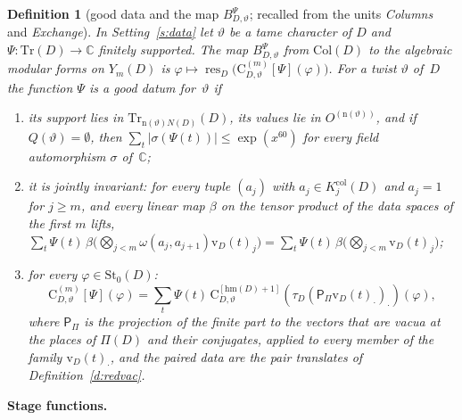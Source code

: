 \documentclass[11pt,a4paper]{article}
\newcommand{\m}[1]{\mbox{$#1$}}        %
\newcommand{\subhead}[1]{\par\addvspace{9pt plus 2pt}\Needspace{4\baselineskip}\noindent\textbf{#1}\enspace\ignorespaces}
\theoremstyle{plainx}
\theoremstyle{uprightx}
\newtheorem{definition}[theorem]{Definition}
\newcommand{\CC}{\mathbb{C}}
\newcommand{\ND}[1]{N(#1)}                         %
\newcommand{\rhoD}[1]{\mathrm{hm}(#1)}                 %
\newcommand{\Ys}[2]{Y_{#2}(#1)}                    %
\newcommand{\PiD}[1]{\Pi(#1)}                      %
\newcommand{\lvn}[1]{\mathrm{n}(#1)}               %
\newcommand{\Qs}[1]{Q(#1)}                         %
\newcommand{\Col}[1]{\mathrm{Col}(#1)}             %
\newcommand{\Stg}[2]{\mathrm{St}_{#2}(#1)}         %
\newcommand{\Bmu}[3]{B^{#3}_{#1,#2}}               %
\newcommand{\Tr}[1]{\mathrm{Tr}(#1)}               %
\newcommand{\Tadm}[2]{\mathrm{Tr}_{#2}(#1)}        %
\newcommand{\tdat}[3]{\mathrm{v}_{#1}(#2)_{#3}}    %
\newcommand{\Kst}[2]{K^{\mathrm{col}}_{#2}(#1)}                   %
\newcommand{\chnn}[4]{\mathrm{C}^{[#4]}_{#1,#2}(#3)}       %
\newcommand{\chcomb}[4]{\mathrm{C}^{(#4)}_{#1,#2}[#3]}     %
\newcommand{\resY}[1]{\operatorname{res}_{#1}}     %
\newcommand{\ptr}[3]{\tau_{#1}(#2)_{#3}}           %
\newcommand{\Oaw}[1]{O^{(#1)}}                     %
\begin{document}
\begin{definition}[good data and the map $\Bmu{D}{\vartheta}{\Psi}$; recalled from the units \emph{Columns} and
\emph{Exchange}]\label{d:good}
In Setting~\ref{s:data} let $\vartheta$ be a tame character of $D$ and $\Psi\colon\Tr{D}\to\CC$ finitely supported.
The map $\Bmu{D}{\vartheta}{\Psi}$ from $\Col{D}$ to the algebraic modular forms on $\Ys{D}{m}$ is
$\varphi\mapsto\resY{D}\bigl(\chcomb{D}{\vartheta}{\Psi}{m}(\varphi)\bigr)$. For a twist $\vartheta$ of~$D$ the
function $\Psi$ is a \emph{good datum for~$\vartheta$} if
\begin{enumerate}[label=(\roman*)]
\item its support lies in \m{\Tadm{D}{\lvn{\vartheta}\ND{D}}}, its values lie in \m{\Oaw{\lvn{\vartheta}}}, and if
  \m{\Qs{\vartheta}=\emptyset}, then $\sum_t|\sigma(\Psi(t))|\le\exp(x^{60})$ for every field automorphism
  $\sigma$ of~$\CC$;
\item it is \emph{jointly invariant}: for every tuple \m{(a_j)} with \m{a_j\in\Kst{D}{j}} and \m{a_j=1} for
  \m{j\ge m}, and every linear map $\beta$ on the tensor product of the data spaces of the first $m$ lifts,
  $\sum_t\Psi(t)\,\beta\bigl(\bigotimes_{j<m}\omega(a_j,a_{j+1})\tdat{D}{t}{j}\bigr)=\sum_t\Psi(t)\,\beta\bigl(\bigotimes_{j<m}\tdat{D}{t}{j}\bigr)$;
\item for every \m{\varphi\in\Stg{D}{0}}:
  \[\chcomb{D}{\vartheta}{\Psi}{m}(\varphi)=\sum_t\Psi(t)\,\chnn{D}{\vartheta}{\ptr{D}{\mathsf{P}_\Pi\tdat{D}{t}{\cdot}}{\cdot}}{\rhoD{D}+1}(\varphi),\]
  where $\mathsf{P}_\Pi$ is the projection of the finite part to the vectors that are vacua at the places of
  $\PiD{D}$ and their conjugates, applied to every member of the family \m{\tdat{D}{t}{\cdot}}, and the paired
  data are the pair translates of Definition~\ref{d:redvac}.
\end{enumerate}
\end{definition}

\subhead{Stage functions.}
\end{document}
